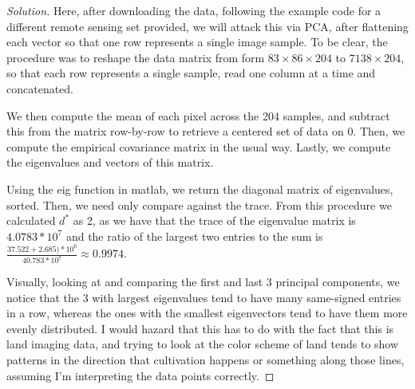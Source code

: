 \documentclass[10pt]{article}
\begin{document}
\begin{proof}[Solution]

Here, after downloading the data, following the example code for a different remote sensing set provided, we will attack this via PCA, after flattening each vector so that one row represents a single image sample. To be clear, the procedure was to reshape the data matrix from form $83 \times 86 \times 204$ to $7138 \times 204$, so that each row represents a single sample, read one column at a time and concatenated.

We then compute the mean of each pixel across the 204 samples, and subtract this from the matrix row-by-row to retrieve a centered set of data on $0$. Then, we compute the empirical covariance matrix in the usual way. Lastly, we compute the eigenvalues and vectors of this matrix.

Using the eig function in matlab, we return the diagonal matrix of eigenvalues, sorted. Then, we need only compare against the trace. From this procedure we calculated $d^*$ as 2, as we have that the trace of the eigenvalue matrix is $4.0783 * 10^7$ and the ratio of the largest two entries to the sum is $\frac{37.522 + 2.685) * 10^6}{40.783*10^7} \approx 0.9974$.

Visually, looking at and comparing the first and last 3 principal components, we notice that the 3 with largest eigenvalues tend to have many same-signed entries in a row, whereas the ones with the smallest eigenvectors tend to have them more evenly distributed. I would hazard that this has to do with the fact that this is land imaging data, and trying to look at the color scheme of land tends to show patterns in the direction that cultivation happens or something along those lines, assuming I'm interpreting the data points correctly.

\end{proof}
\end{document}
